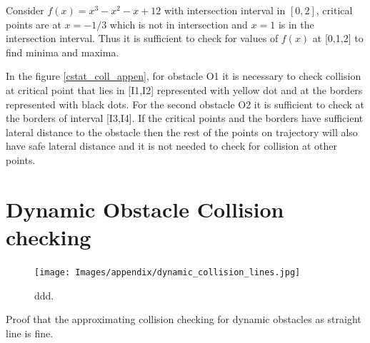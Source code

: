 Consider $f(x) = x^3 - x^2 -x + 12$ with intersection interval in $[0,2]$, critical points are at $x=-1/3$ which is not in intersection and $x=1$ is in the intersection interval. Thus it is sufficient to check for values of $f(x)$ at [0,1,2] to find minima and maxima. 

In the figure \ref{cstat_coll_appen}, for obstacle O1 it is necessary to check collision at critical point that lies in [I1,I2] represented with yellow dot and at the borders represented with black dots. For the second obstacle O2 it is sufficient to check at the borders of interval [I3,I4]. If the critical points and the borders have sufficient lateral distance to the obstacle then the rest of the points on trajectory will also have safe lateral distance and it is not needed to check for collision at other points. 


\section{Dynamic Obstacle Collision checking}

\begin{figure}
	\centering
	\texttt{[image: Images/appendix/dynamic\_collision\_lines.jpg]}
	\caption{ddd.}
	\label{dynamic_appendix}
\end{figure}


Proof that the approximating collision checking for dynamic obstacles as straight line is fine. 

